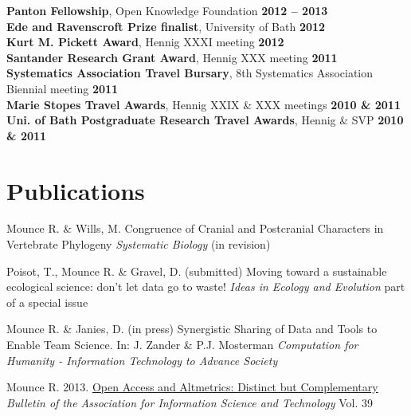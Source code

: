 \documentclass[margin,line]{resume}
\begin{document}
\begin{resume}
   \textbf{Panton Fellowship}, Open Knowledge Foundation \hfill \textbf{2012 -- 2013} \vspace{1mm}\\%
    \textbf{Ede and Ravenscroft Prize finalist}, University of Bath \hfill \textbf{2012}  \vspace{1mm}\\%
    \textbf{Kurt M. Pickett Award}, Hennig XXXI meeting \hfill \textbf{2012}  \vspace{1mm}\\%
    \textbf{Santander Research Grant Award}, Hennig XXX meeting \hfill \textbf{2011}      \vspace{1mm}\\%
    \textbf{Systematics Association Travel Bursary}, 8th Systematics Association Biennial meeting \hfill \textbf{2011} \vspace{1mm}\\%
    \textbf{Marie Stopes Travel Awards}, Hennig XXIX \& XXX meetings \hfill \textbf{2010 \& 2011}    \vspace{1mm}\\%
    \textbf{Uni. of Bath Postgraduate Research Travel Awards}, Hennig \& SVP \hfill \textbf{2010 \& 2011} \vspace{1mm}\\

\vspace{-7 mm}
    \section{\mysidestyle Publications}
    Mounce R. \& Wills, M. Congruence of Cranial and Postcranial Characters in Vertebrate Phylogeny \textsl{Systematic Biology} (in revision)

\vspace{-2mm}
    Poisot, T., Mounce R. \& Gravel, D. (submitted) Moving toward a sustainable ecological science: don't let data go to waste! \textsl{Ideas in Ecology and Evolution} {\color{red} part of a special issue}

\vspace{-2mm}
    Mounce R. \& Janies, D. (in press) Synergistic Sharing of Data and Tools to Enable Team Science.
    In: J. Zander \& P.J. Mosterman
    \textsl{Computation for Humanity - Information Technology to Advance Society}

\vspace{-2mm}
    Mounce R. 2013.  \href{http://www.asis.org/Bulletin/Apr-13/AprMay13_Mounce.pdf}{Open Access and Altmetrics: Distinct but Complementary} \\ \textsl{Bulletin of the Association for Information Science and Technology} Vol. 39


\end{resume}
\end{document}
